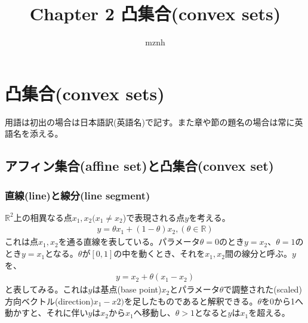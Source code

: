 \documentclass[a4paper, 10pt, notitlepage, uplatex]{jsreport}
\title{Chapter 2 凸集合(convex sets)}
\author{mznh}
\date{}
\begin{document}
\maketitle
\setcounter{chapter}{1}
\chapter{凸集合(convex sets)}
用語は初出の場合は日本語訳(英語名)で記す。また章や節の題名の場合は常に英語名を添える。
\section{アフィン集合(affine set)と凸集合(convex set)}
\subsection{直線(line)と線分(line segment)}
$\mathbb{R}^2$上の相異なる点$x_1,x_2 (x_1\neq x_2$)で表現される点$y$を考える。
\begin{align*}
y = \theta x_1 + (1 - \theta)x_2, (\theta \in \mathbb{R})
\end{align*}
これは点$x_1,x_2$を通る直線を表している。パラメータ$\theta = 0$のとき$y = x_2$、$\theta = 1$のとき$y = x_1$となる。$\theta$が$[0,1]$の中を動くとき、それを$x_1,x_2$間の線分と呼ぶ。$y$を、
\begin{align*}
y = x_2 + \theta(x_1 - x_2)
\end{align*}
と表してみる。これは$y$は基点(base point)$x_2$とパラメータ$\theta$で調整された(scaled)方向ベクトル(direction)$x_1-x2)$を足したものであると解釈できる。$\theta$を0から1へ動かすと、それに伴い$y$は$x_2$から$x_1$へ移動し、$\theta > 1$となると$y$は$x_1$を超える。
\end{document}
